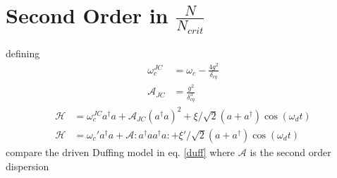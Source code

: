 \documentclass{amsart}
\begin{document}
    \section{Second Order in $\frac{N}{N_{crit}}$}
    defining
    \begin{align}
        \omega_c^{JC} &= \omega_c - \frac{4g^2}{\delta_{cq}}\\
        \mathscr{A}_{JC} &= \frac{g^2}{\delta_{cq}^3}
    \end{align}
    \begin{align}
        \mathscr{H} &= \omega_c^{JC} a ^ \dagger a
        + \mathscr{A}_{JC}\left(a^\dagger a\right)^2
        + \xi/\sqrt{2} ( a + a^\dagger ) \cos(\omega_d t)\\
        \mathscr{H} &= \omega_c' a^\dagger a
        + \mathscr{A} : a ^ \dagger a a ^ \dagger a :
        + \xi'/\sqrt{2}(a+a^\dagger)\cos(\omega_d t)\label{duff}
    \end{align}
    compare the driven Duffing model in eq. \ref{duff}
    where $\mathscr{A}$ is the second order dispersion\cite{Drummond1979}

\printbibliography
\end{document}
